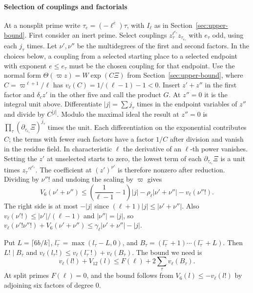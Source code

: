 \paragraph{Selection of couplings and factorials}
At a nonsplit prime write \(\tau_e=(-\ell^e)\tau\), with \(I_\ell\) as in
Section~\ref{sec:upper-bound}. First consider an inert prime. Select couplings
\(z_\tau^{\ell^{e_\tau}}z_{\tau_{e_\tau}}\) with \(e_\tau\) odd, using each
\(j_\tau\) times. Let \(\nu',\nu''\) be the multidegrees of the first and second
factors. In the choices below, a coupling from a selected starting place to
a selected endpoint with exponent \(e\le e_\tau\) must be the chosen coupling
for that endpoint. Use the normal form \(\Theta(\varpi z)=W\exp(C\Xi)\)
from Section~\ref{sec:upper-bound}, where \(C=\varpi^{\ell+1}/\ell\) has
\(v_\ell(C)=1/(\ell-1)-1<0\). Insert \(z'+z''\) in the first factor and
\(\delta_c z'\) in the other five and call the product \(G\).
At \(z''=0\) it is the integral unit above. Differentiate \(|j|=\sum j_\tau\)
times in the endpoint variables of \(z''\) and divide by \(C^{|j|}\).
Modulo the maximal ideal the result at \(z''=0\) is
\(\prod_\tau(\partial_{\tau_{e_\tau}}\Xi)^{j_\tau}\) times the unit.
Each differentiation on the exponential contributes \(C\); the terms
with fewer such factors have a factor \(1/C\) after division and vanish
in the residue field. In characteristic \(\ell\) the derivative of an
\(\ell\)-th power vanishes. Setting the \(z'\) at unselected starts to zero,
the lowest term of each \(\partial_{\tau_{e_\tau}}\Xi\) is a unit times
\(z_\tau'{}^{\ell^{e_\tau}}\). The coefficient at \((z')^{\nu'}\)
is therefore nonzero after reduction. Dividing by \(\nu''!\) and
undoing the scaling by \(\varpi\) gives
\begin{equation}\label{eq:attain-coupling}
 V_6(\nu'+\nu'')
 \le \left(\frac1{\ell-1}-1\right)|j|
      -\rho_\ell|\nu'+\nu''|-v_\ell(\nu''!).
\end{equation}
The right side is at most \(-|j|\) since
\((\ell+1)|j|\le|\nu'+\nu''|\). Also
\(v_\ell(\nu'!)\le|\nu'|/(\ell-1)\) and \(|\nu''|=|j|\), so
\(v_\ell(\nu'!\nu''!)+V_6(\nu'+\nu'')\le\gamma_\ell|\nu'+\nu''|-|j|\).

Put \(L=\lceil6b/k\rceil\), \(l_\tau^-=\max(l_\tau-L,0)\), and
\(B_\tau=(l_\tau^-+1)\cdots(l_\tau^-+L)\).
Then \(L!\mid B_\tau\) and
\(v_\ell(l_\tau!)\le v_\ell(l_\tau^-!)+v_\ell(B_\tau)\).
The bound we need is
\begin{equation}\label{eq:attain-twelve}
 v_\ell(l!)+V_{12}(l)\le F(\ell)+2\sum_\tau v_\ell(B_\tau).
\end{equation}
At split primes \(F(\ell)=0\), and the bound follows from
\(V_6(l)\le-v_\ell(l!)\) by adjoining six factors of degree \(0\).

